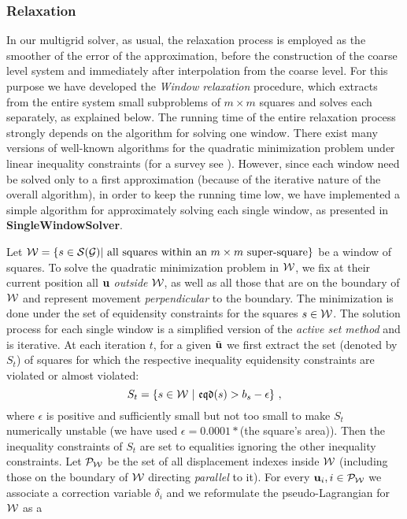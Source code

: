 \documentclass[final]{siamltex}
\begin{document}
\subsubsection{Relaxation}\label{sRelax}
\par In our multigrid solver, as usual, the relaxation process is employed
as the smoother of the error of the approximation, before the
construction of the coarse level system and immediately
after interpolation from the coarse level. For this purpose we
have developed the {\it Window relaxation} procedure,
which extracts from the entire system small subproblems of
$m\times m$ squares and solves each separately, as explained
below. The running time of the entire relaxation process strongly
depends on the algorithm for solving one window. There exist many
 versions of well-known algorithms for the quadratic
minimization problem under linear inequality constraints (for a
survey see \cite{avriel}). However, since each window need be
solved only to a first approximation (because of the iterative nature
of the overall algorithm), in order to keep the running time low,
we have implemented a simple algorithm for approximately solving
each single window, as presented in {\bf SingleWindowSolver}.
\par Let
$\mathcal{W} = \{s\in \mathcal{S}(\mathcal{G}) | \text{ all squares within an $m\times m$
super-square}\}$ be a window of squares.
To solve the quadratic minimization problem in $\mathcal{W}$, we
fix at their current position all ${\bf u}$ {\it outside} $\mathcal{W}$, as
well as all those that are on the boundary of $\mathcal{W}$ and
represent movement {\it perpendicular} to the boundary.
The minimization is done under the set of equidensity constraints
for the squares $s\in \mathcal{W}$.
The solution process for each single window is a simplified
version of the {\it active set method} and is iterative. At
each iteration $t$, for a given $\tilde{{\bf u}}$ we first extract the
set (denoted by $S_t$) of squares for which the respective
inequality equidensity constraints are violated or almost
violated:
\[
S_t=\{s\in \mathcal{W}~|~ \mathfrak{eqd}(s)> b_s -\epsilon \}~,
\]
where $\epsilon$ is positive and sufficiently small but not too
small to make $S_t$ numerically unstable (we have used
$\epsilon=0.0001*$(the square's area)). Then the inequality
constraints of $S_t$ are set to equalities ignoring the other
inequality constraints.
Let $\bold{\mathcal{P}}_{\mathcal{W}}$ be the set of all displacement indexes inside $\mathcal{W}$
(including those on the boundary of $\mathcal{W}$ directing {\it
parallel} to it).
For every ${\bf u}_i, i \in \bold{\mathcal{P}}_{\mathcal{W}}$ we associate a correction variable
$\delta_i$ and we reformulate the pseudo-Lagrangian for $\mathcal{W}$ as a
\end{document}
